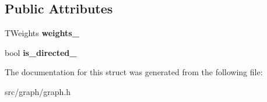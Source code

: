 \subsection*{Public Attributes}
\begin{DoxyCompactItemize}
\item 
\hypertarget{structall__distance__sketch_1_1graph_1_1WeightMap_a9745ced75b5edc4409424c3cefc80c72}{}T\+Weights {\bfseries weights\+\_\+}\label{structall__distance__sketch_1_1graph_1_1WeightMap_a9745ced75b5edc4409424c3cefc80c72}

\item 
\hypertarget{structall__distance__sketch_1_1graph_1_1WeightMap_aea5590f980a11329a5170f1e4cab2648}{}bool {\bfseries is\+\_\+directed\+\_\+}\label{structall__distance__sketch_1_1graph_1_1WeightMap_aea5590f980a11329a5170f1e4cab2648}

\end{DoxyCompactItemize}


The documentation for this struct was generated from the following file\+:\begin{DoxyCompactItemize}
\item 
src/graph/graph.\+h\end{DoxyCompactItemize}
